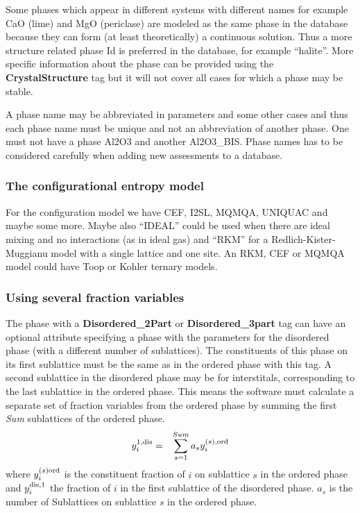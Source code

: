 \documentclass{article}
\begin{document}
Some phases which appear in different systems with different names for
example CaO (lime) and MgO (periclase) are modeled as the same phase
in the database because they can form (at least theoretically) a
continuous solution.  Thus a more structure related phase {\rm Id} is
preferred in the database, for example ``halite''.  More specific
information about the phase can be provided using the {\bf
  CrystalStructure} tag but it will not cover all cases for which a
phase may be stable.

A phase name may be abbreviated in parameters and some other cases and
thus each phase name must be unique and not an abbreviation of another
phase.  One must not have a phase Al2O3 and another Al2O3\_BIS.  Phase
names has to be considered carefully when adding new assessments to a
database.

\subsubsection{The configurational entropy model}\label{sec:cfg}

For the configuration model we have CEF, I2SL, MQMQA, UNIQUAC and
maybe some more.  Maybe also ``IDEAL'' could be used when there are
ideal mixing and no interactions (as in ideal gas) and ``RKM'' for a
Redlich-Kister-Muggianu model with a single lattice and one site.  An
RKM, CEF or MQMQA model could have Toop or Kohler ternary models.

\subsubsection{Using several fraction variables}\label{sec:nodis}

The phase with a {\bf Disordered\_2Part} or {\bf Disordered\_3part}
tag can have an optional attribute specifying a phase with the
parameters for the disordered phase (with a different number of
sublattices). The constituents of this phase on its first sublattice
must be the same as in the ordered phase with this tag.  A second
sublattice in the disordered phase may be for interstitals,
corresponding to the last sublattice in the ordered phase.  This means
the software must calculate a separate set of fraction variables from
the ordered phase by summing the first {\em Sum} sublattices of the
ordered phase.
\begin{eqnarray}
y^{1,\rm dis}_i &=& \sum^{Sum}_{s=1} a_s y^{(s),\rm ord}_i
\end{eqnarray}
where $y^{(s)\rm ord}_i$ is the constituent fraction of $i$ on
sublattice $s$ in the ordered phase and $y^{\rm dis,1}_i$ the fraction
of $i$ in the first sublattice of the disordered phase.  $a_s$ is the
number of Sublattices on sublattice $s$ in the ordered phase.
\end{document}

